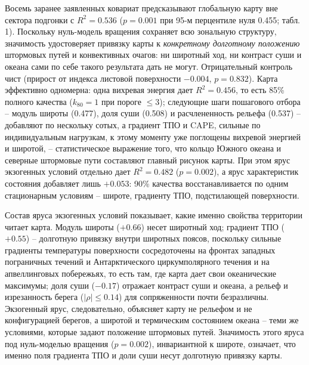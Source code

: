 \documentclass[12pt,a4paper]{article}
\begin{document}
Восемь заранее заявленных ковариат предсказывают глобальную карту вне сектора подгонки с $R^2 = 0.536$ ($p = 0.001$ при 95-м перцентиле нуля 0.455; табл. 1). Поскольку нуль-модель вращения сохраняет всю зональную структуру, значимость удостоверяет привязку карты к \emph{конкретному долготному положению} штормовых путей и конвективных очагов: ни широтный ход, ни контраст суши и океана сами по себе такого результата дать не могут. Отрицательный контроль чист (прирост от индекса листовой поверхности $-0.004$, $p = 0.832$). Карта эффективно одномерна: одна вихревая энергия дает $R^2 = 0.456$, то есть 85\% полного качества ($k_{80} = 1$ при пороге $\le 3$); следующие шаги пошагового отбора -- модуль широты (0.477), доля суши (0.508) и расчлененность рельефа (0.537) -- добавляют по нескольку сотых, а градиент ТПО и CAPE, сильные по индивидуальным нагрузкам, к этому моменту уже поглощены вихревой энергией и широтой, -- статистическое выражение того, что кольцо Южного океана и северные штормовые пути составляют главный рисунок карты. При этом ярус экзогенных условий отдельно дает $R^2 = 0.482$ ($p = 0.002$), а ярус характеристик состояния добавляет лишь $+0.053$: 90\% качества восстанавливается по одним стационарным условиям -- широте, градиенту ТПО, подстилающей поверхности.

Состав яруса экзогенных условий показывает, какие именно свойства территории читает карта. Модуль широты ($+0.66$) несет широтный ход; градиент ТПО ($+0.55$) -- долготную привязку внутри широтных поясов, поскольку сильные градиенты температуры поверхности сосредоточены на фронтах западных пограничных течений и Антарктического циркумполярного течения и на апвеллинговых побережьях, то есть там, где карта дает свои океанические максимумы; доля суши ($-0.17$) отражает контраст суши и океана, а рельеф и изрезанность берега ($|\rho| \le 0.14$) для сопряженности почти безразличны. Экзогенный ярус, следовательно, объясняет карту не рельефом и не конфигурацией берегов, а широтой и термическим состоянием океана -- теми же условиями, которые задают положение штормовых путей. Значимость этого яруса под нуль-моделью вращения ($p = 0.002$), инвариантной к широте, означает, что именно поля градиента ТПО и доли суши несут долготную привязку карты.
\end{document}
